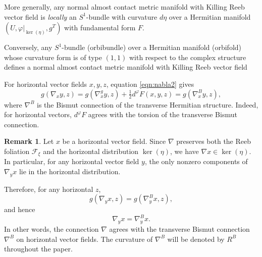 \documentclass{article}
\theoremstyle{definition}
\newtheorem{rmk}[thm]{Remark}
\renewcommand{\phi}{\varphi}
\numberwithin{equation}{section}
\begin{document}
More generally, any normal almost contact metric manifold with Killing Reeb vector field is \emph{locally} an \(S^1\)-bundle with curvature \(d\eta\) over a Hermitian manifold \((U, \phi|_{\ker(\eta)}, g^T)\) with fundamental form \(F\).

Conversely, any \(S^1\)-bundle (orbibundle) over a Hermitian manifold (orbifold) whose curvature form is of type \((1,1)\) with respect to the complex structure defines a normal almost contact metric manifold with Killing Reeb vector field \cite{CoMa}

\medskip

For horizontal vector fields \(x,y,z\), equation \eqref{eqn:nabla2} gives
\[
g(\nabla_x y, z) = g(\nabla^g_x y, z) + \tfrac12 d^\phi F(x,y,z) = g(\nabla^B_x y, z),
\]
where \(\nabla^B\) is the Bismut connection of the transverse Hermitian structure.
Indeed, for horizontal vectors, \(d^\phi F\) agrees with the torsion of the transverse Bismut connection. 
\begin{rmk}\label{rmk:rmk2}
Let $x$ be a horizontal vector field.  
Since $\nabla$ preserves both the Reeb foliation $\mathcal{F}_\xi$ and the horizontal distribution $\ker(\eta)$, we have $\nabla x \in \ker(\eta)$.  
In particular, for any horizontal vector field $y$, the only nonzero components of $\nabla_y x$ lie in the horizontal distribution.  

  Therefore, for any horizontal $z$,
\[
g(\nabla_y x, z) = g(\nabla^B_y x, z),
\]
and hence
\[
\nabla_y x = \nabla^B_y x.
\]
In other words, the connection $\nabla$ agrees with the transverse Bismut connection $\nabla^B$ on horizontal vector fields. The curvature of $\nabla^B$ will be denoted by $R^B$ throughout the paper.
\end{rmk}
\end{document}
